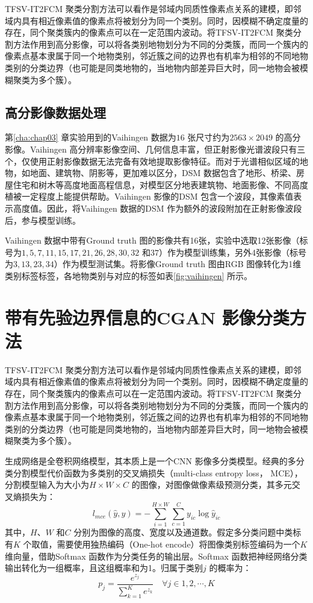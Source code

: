 TFSV-IT2FCM 聚类分割方法可以看作是邻域内同质性像素点关系的建模，即邻域内具有相近像素值的像素点将被划分为同一个类别。同时，因模糊不确定度量的存在，同个聚类簇内的像素点可以在一定范围内波动。将TFSV-IT2FCM 聚类分割方法作用到高分影像，可以将各类别地物划分为不同的分类簇，而同一个簇内的像素点基本隶属于同一个地物类别，邻近簇之间的边界也有机率为相邻的不同地物类别的分类边界（也可能是同类地物的，当地物内部差异巨大时，同一地物会被模糊聚类为多个簇）。


\subsection{高分影像数据处理}
\label{subsec:chap04-2-2}
第\ref{cha:chap03} 章实验用到的Vaihingen 数据为$16$ 张尺寸约为$ 2563 \times 2049$ 的高分影像。Vaihingen 高分辨率影像空间、几何信息丰富，但正射影像光谱波段只有三个，仅使用正射影像数据无法完备有效地提取影像特征。而对于光谱相似区域的地物，如地面、建筑物、阴影等，更加难以区分，DSM 数据包含了地形、桥梁、房屋住宅和树木等高度地面高程信息，对模型区分地表建筑物、地面影像、不同高度植被一定程度上能提供帮助。Vaihingen 影像的DSM 包含一个波段，其像素值表示高度值。因此，将Vaihingen 数据的DSM 作为额外的波段附加在正射影像波段后，参与模型训练。


Vaihingen 数据中带有Ground truth 图的影像共有16张，实验中选取12张影像（标号为$1,5,7,11,15,17,21,26,28,30,32$ 和$37$）作为模型训练集，另外4张影像（标号为$3,13,23,34$）作为模型测试集。将影像Ground truth 图由RGB 图像转化为1维类别标签标签，各地物类别与对应的标签如表\ref{fig:vaihingen} 所示。

\section{带有先验边界信息的CGAN 影像分类方法}
\label{sec::chap04-4}

TFSV-IT2FCM 聚类分割方法可以看作是邻域内同质性像素点关系的建模，即邻域内具有相近像素值的像素点将被划分为同一个类别。同时，因模糊不确定度量的存在，同个聚类簇内的像素点可以在一定范围内波动。将TFSV-IT2FCM 聚类分割方法作用到高分影像，可以将各类别地物划分为不同的分类簇，而同一个簇内的像素点基本隶属于同一个地物类别，邻近簇之间的边界也有机率为相邻的不同地物类别的分类边界（也可能是同类地物的，当地物内部差异巨大时，同一地物会被模糊聚类为多个簇）。

生成网络是全卷积网络模型，其本质上是一个CNN 影像多分类模型。经典的多分类分割模型代价函数为多类别的交叉熵损失（multi-class entropy loss， MCE），分割模型输入为大小为$H\times W\times C$ 的图像，对图像做像素级预测分类，其多元交叉熵损失为：
\begin{equation}
  \label{eq:4-5}
  l_{mce} (\hat{y}, y) = -\sum_{i=1}^{H\times W}\sum_{c=1}^{C}y_{ic}\log\hat{y}_{ic}
\end{equation}
其中，$H$、$W$ 和$C$ 分别为图像的高度、宽度以及通道数。假定多分类问题中类标有$K$ 个取值，需要使用独热编码（One-hot encode）将图像类别标签编码为一个$K$ 维向量，借助Softmax 函数作为分类任务的输出层。Softmax 函数把神经网络分类输出转化为一组概率，且这组概率和为1。归属于类别$j$ 的概率为：
\begin{equation}
  \label{eq:4-6}
  p_j = \frac{e^{z_j}}{\sum_{k=1}^Ke^{z_k}}  \quad \forall j \in 1,2,\cdots, K
\end{equation}

